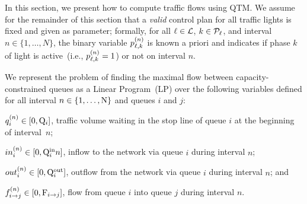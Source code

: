 In this section, we present how to compute traffic flows using QTM.
%
We assume for the remainder of this section that a \emph{valid} control plan for
all traffic lights is fixed and given as parameter;
%
formally, for all $\ell \in \mathcal{L}$, $k \in \mathcal{P}_\ell$, and interval $n \in
\{1,\dots,N\}$, the binary variable $p_{\ell,k}^{(n)}$ is known a priori and indicates
if phase $k$ of light \tl is active~(i.e., $p_{\ell,k}^{(n)} = 1$) or not on interval
$n$.


We represent the problem of finding the maximal flow between
capacity-constrained queues as a Linear Program~(LP) over the following
variables defined for all interval $n \in \{1,\dots,\mathrm{N}\}$ and queues $i$ and
$j$:
%
\begin{itemize*}[label={}]
%
\item $q_{i}^{(n)} \in [0,\mathrm{Q}_{i}]$, traffic volume waiting in the stop line of queue
  $i$ at the beginning of interval~$n$;
%
\item $in_{i}^{(n)} \in [0,\mathrm{Q}_{i}^{\mathrm{in}}{n}]$, inflow to the network via queue $i$ during
  interval $n$;
%
\item $out_{i}^{(n)} \in [0,\mathrm{Q}_{i}^{\mathrm{out}}]$, outflow from the network via queue $i$ during
  interval $n$; and
%
\item $f_{i\to j}^{(n)} \in [0,\mathrm{F}_{i\to j}]$, flow from queue $i$ into queue $j$ during
  interval $n$.
%
\end{itemize*}







